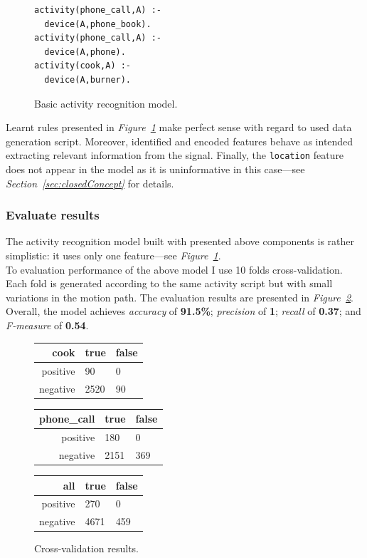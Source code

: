 \documentclass[10pt, a4paper, pdflatex, leqno, twoside, openright]{report}
\begin{document}
\begin{figure}[htb]
  \begin{verbatim}
activity(phone_call,A) :-
  device(A,phone_book).
activity(phone_call,A) :-
  device(A,phone).
activity(cook,A) :-
  device(A,burner).
  \end{verbatim}
  \caption{Basic activity recognition model.\label{lst:alephBasicModel}}
\end{figure}

Learnt rules presented in \emph{Figure~\ref{lst:alephBasicModel}} make perfect sense with regard to used data generation script. Moreover, identified and encoded features behave as intended extracting relevant information from the signal. Finally, the \texttt{location} feature does not appear in the model as it is uninformative in this case---see \emph{Section~\ref{sec:closedConcept}} for details.

      \subsubsection{Evaluate results}
The activity recognition model built with presented above components is rather simplistic: it uses only one feature---see \emph{Figure~\ref{lst:alephBasicModel}}.\\

To evaluation performance of the above model I use 10 folds cross-validation. Each fold is generated according to the same activity script but with small variations in the motion path. The evaluation results are presented in \emph{Figure~\ref{tab:basicStats}}. Overall, the model achieves \emph{accuracy} of \textbf{91.5\%}; \emph{precision} of \textbf{1}; \emph{recall} of \textbf{0.37}; and \emph{F-measure} of \textbf{0.54}.\\

\begin{figure}[htb]
  \centering
  \begin{tabular}{ r | l l}
cook & true & false\\
\hline
positive & 90 & 0\\
negative & 2520 & 90\\
  \end{tabular}
  \begin{tabular}{ r | l l}
phone\_call & true & false\\
\hline
positive & 180 & 0\\
negative & 2151 & 369\\
  \end{tabular}
  \begin{tabular}{ r | l l}
all & true & false\\
\hline
positive & 270 & 0\\
negative & 4671 & 459\\
  \end{tabular}
  \caption{Cross-validation results.\label{tab:basicStats}}
\end{figure}
\end{document}
